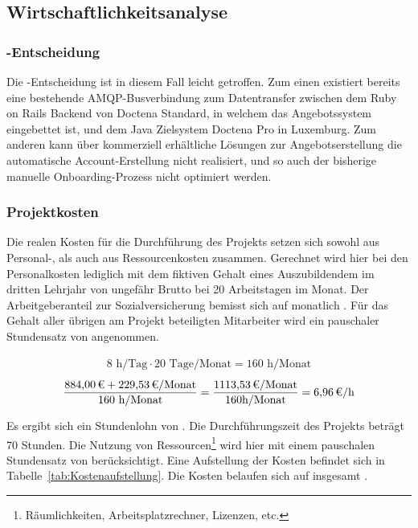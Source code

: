 \subsection{Wirtschaftlichkeitsanalyse}
\label{sec:Wirtschaftlichkeitsanalyse}

\subsubsection{-Entscheidung}
\label{sec:MakeOrBuyEntscheidung}
Die -Entscheidung ist in diesem Fall leicht getroffen. Zum einen existiert bereits eine bestehende \ac{AMQP}-Busverbindung zum Datentransfer zwischen dem Ruby on Rails Backend von Doctena Standard, in welchem das Angebotssystem eingebettet ist, und dem Java Zielsystem Doctena Pro in Luxemburg. Zum anderen kann über kommerziell erhältliche Lösungen zur Angebotserstellung die automatische Account-Erstellung nicht realisiert, und so auch der bisherige manuelle Onboarding-Prozess nicht optimiert werden.

\subsubsection{Projektkosten}
\label{sec:Projektkosten}
Die realen Kosten für die Durchführung des Projekts setzen sich sowohl aus Personal-, als auch aus Ressourcenkosten zusammen. Gerechnet wird hier bei den Personalkosten lediglich mit dem fiktiven Gehalt eines Auszubildendem im dritten Lehrjahr von ungefähr  Brutto bei 20 Arbeitstagen im Monat. Der Arbeitgeberanteil zur Sozialversicherung bemisst sich auf monatlich . Für das Gehalt aller übrigen am Projekt beteiligten Mitarbeiter wird ein pauschaler Stundensatz von  angenommen.

\begin{eqnarray}
8 \mbox{ h/Tag}  \cdot 20 \mbox{ Tage/Monat}  = 160  \mbox{ h/Monat}
\end{eqnarray}
\begin{eqnarray}
\frac{\eur{884,00} + \eur{229,53}\mbox{/Monat}}{160\mbox{ h/Monat}} = \frac{\eur{1113,53}\mbox{/Monat}}{160\mbox{h/Monat}} = \eur{6,96}\mbox{/h}
\end{eqnarray}

Es ergibt sich ein Stundenlohn von . Die Durchführungszeit des Projekts beträgt 70 Stunden. Die Nutzung von Ressourcen\footnote{Räumlichkeiten, Arbeitsplatzrechner, Lizenzen, etc.} wird hier mit einem pauschalen Stundensatz von  berücksichtigt. Eine Aufstellung der Kosten befindet sich in Tabelle~\ref{tab:Kostenaufstellung}. Die Kosten belaufen sich auf insgesamt .

